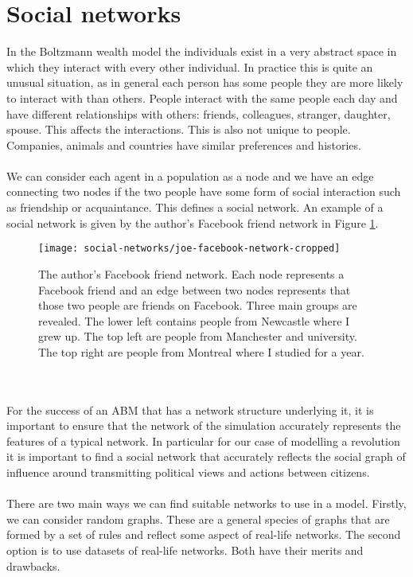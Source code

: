 \section{Social networks}
In the Boltzmann wealth model the individuals exist in a very abstract space in which they interact with every other individual. In practice this is quite an unusual situation, as in general each person has some people they are more likely to interact with than others. People interact with the same people each day and have different relationships with others: friends, colleagues, stranger, daughter, spouse. This affects the interactions. This is also not unique to people. Companies, animals and countries have similar preferences and histories.\\
\\
We can consider each agent in a population as a node and we have an edge connecting two nodes if the two people have some form of social interaction such as friendship or acquaintance. This defines a social network\cite{networks}. An example of a social network is given by the author's Facebook friend network in Figure \ref{fig:facebook-network}.
\begin{figure}[h]
	\centering
	\texttt{[image: social-networks/joe-facebook-network-cropped]}
	\caption{The author's Facebook friend network. Each node represents a Facebook friend and an edge between two nodes represents that those two people are friends on Facebook. Three main groups are revealed. The lower left contains people from Newcastle where I grew up. The top left are people from Manchester and university. The top right are people from Montreal where I studied for a year.}
	\label{fig:facebook-network}
\end{figure}\\
\\
For the success of an ABM that has a network structure underlying it, it is important to ensure that the network of the simulation accurately represents the features of a typical network. In particular for our case of modelling a revolution it is important to find a social network that accurately reflects the social graph of influence around transmitting political views and actions between citizens.\\
\\
There are two main ways we can find suitable networks to use in a model. Firstly, we can consider random graphs. These are a general species of graphs that are formed by a set of rules and reflect some aspect of real-life networks. The second option is to use datasets of real-life networks. Both have their merits and drawbacks.
